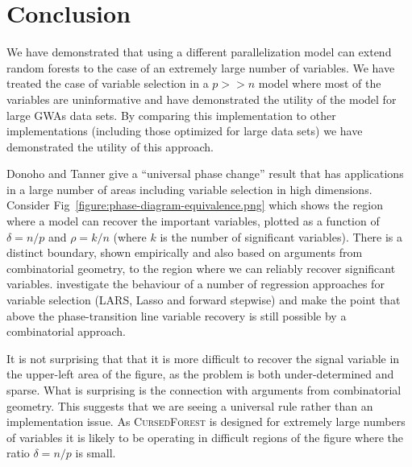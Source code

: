 \documentclass[10pt,letterpaper]{article}
\newcommand{\cursedforest}{\textsc{CursedForest}\xspace}
\newcommand{\mtry}{\texttt{mtry}\xspace}
\begin{document}




\section{Conclusion}
We have demonstrated that using a different parallelization model can extend random forests to the case of an
extremely large number of variables. We have treated the case of variable selection in a $p >> n$ model where most of
the variables are uninformative and have demonstrated the utility of the model for large GWAs data sets. By comparing
this implementation to other implementations (including those optimized for large data sets) we have demonstrated the
utility of this approach.

Donoho and Tanner \cite{Donoho.and.Tanner.2009} give a ``universal phase change'' result that has applications in a
large number of areas including variable selection in high dimensions. Consider
Fig~\ref{figure:phase-diagram-equivalence.png} which shows the region where a model can recover the important variables,
plotted as a function of $\delta = n/p$ and $\rho =k/n$ (where $k$ is the number of significant variables). There is a
distinct boundary, shown empirically and also based on arguments from combinatorial geometry, to the region where we can
reliably recover significant variables.  \cite{Donoho.and.Stodden.2006} investigate the behaviour of a number of
regression approaches for variable selection (LARS, Lasso and forward stepwise) and make the point that above the
phase-transition line variable recovery is still possible by a combinatorial approach.

It is not surprising that that it is more difficult to recover the signal variable in the upper-left area of the figure,
as the problem is both under-determined and sparse. What is surprising is the connection with arguments from
combinatorial geometry. This suggests that we are seeing a universal rule rather than an implementation issue. As
\cursedforest is designed for extremely large numbers of variables it is likely to be operating in difficult regions of
the figure where the ratio $\delta = n/p$ is small.
\end{document}
